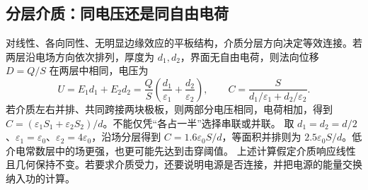 \subsection{分层介质：同电压还是同自由电荷}
对线性、各向同性、无明显边缘效应的平板结构，介质分层方向决定等效连接。若两层沿电场方向依次排列，厚度为 $d_1,d_2$，界面无自由电荷，则法向位移 $D=Q/S$ 在两层中相同，电压为
\[
 U=E_1d_1+E_2d_2=\frac QS\left(\frac{d_1}{\varepsilon_1}+\frac{d_2}{\varepsilon_2}\right),\qquad
 C=\frac S{d_1/\varepsilon_1+d_2/\varepsilon_2}.
\]
若介质左右并排、共同跨接两块极板，则两部分电压相同，电荷相加，得到
$C=(\varepsilon_1S_1+\varepsilon_2S_2)/d$。不能仅凭“各占一半”选择串联或并联。
取 $d_1=d_2=d/2$、$\varepsilon_1=\varepsilon_0$、$\varepsilon_2=4\varepsilon_0$，沿场分层得到 $C=1.6\varepsilon_0S/d$，等面积并排则为 $2.5\varepsilon_0S/d$。低介电常数层中的场更强，也更可能先达到击穿阈值。
上述计算假定介质响应线性且几何保持不变。若要求介质受力，还要说明电源是否连接，并把电源的能量交换纳入功的计算。

